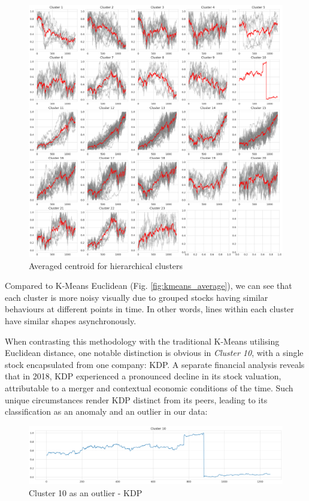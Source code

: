 \documentclass[11pt]{article}
\begin{document}
\begin{figure}[H]
\centering
\includegraphics[width=12cm]{img/kernel-average.png} 
\caption{Averaged centroid for hierarchical clusters}
\label{fig:kernel-average}
\end{figure}

Compared to K-Means Euclidean (Fig. \ref{fig:kmeans_average}), we can see that each cluster is more noisy visually due to grouped stocks having similar behaviours at different points in time. In other words, lines within each cluster have similar shapes asynchronously. 

When contrasting this methodology with the traditional K-Means utilising Euclidean distance, one notable distinction is obvious in \textit{Cluster 10}, with a single stock encapsulated from one company: KDP. A separate financial analysis reveals that in 2018, KDP experienced a pronounced decline in its stock valuation, attributable to a merger and contextual economic conditions of the time. Such unique circumstances render KDP distinct from its peers, leading to its classification as an anomaly and an outlier in our data:

\begin{figure}[H]
\centering
\includegraphics[width=12cm]{img/kernel-cluster10.png} 
\caption{Cluster 10 as an outlier - KDP}
\label{fig:kernel-cluster10}
\end{figure}
\end{document}
